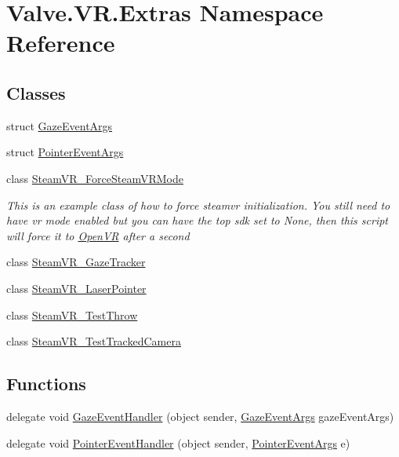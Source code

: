 \hypertarget{namespace_valve_1_1_v_r_1_1_extras}{}\section{Valve.\+V\+R.\+Extras Namespace Reference}
\label{namespace_valve_1_1_v_r_1_1_extras}
\subsection*{Classes}
\begin{DoxyCompactItemize}
\item 
struct \mbox{\hyperlink{struct_valve_1_1_v_r_1_1_extras_1_1_gaze_event_args}{Gaze\+Event\+Args}}
\item 
struct \mbox{\hyperlink{struct_valve_1_1_v_r_1_1_extras_1_1_pointer_event_args}{Pointer\+Event\+Args}}
\item 
class \mbox{\hyperlink{class_valve_1_1_v_r_1_1_extras_1_1_steam_v_r___force_steam_v_r_mode}{Steam\+V\+R\+\_\+\+Force\+Steam\+V\+R\+Mode}}
\begin{DoxyCompactList}\small\item\em This is an example class of how to force steamvr initialization. You still need to have vr mode enabled but you can have the top sdk set to None, then this script will force it to \mbox{\hyperlink{class_valve_1_1_v_r_1_1_open_v_r}{Open\+VR}} after a second \end{DoxyCompactList}\item 
class \mbox{\hyperlink{class_valve_1_1_v_r_1_1_extras_1_1_steam_v_r___gaze_tracker}{Steam\+V\+R\+\_\+\+Gaze\+Tracker}}
\item 
class \mbox{\hyperlink{class_valve_1_1_v_r_1_1_extras_1_1_steam_v_r___laser_pointer}{Steam\+V\+R\+\_\+\+Laser\+Pointer}}
\item 
class \mbox{\hyperlink{class_valve_1_1_v_r_1_1_extras_1_1_steam_v_r___test_throw}{Steam\+V\+R\+\_\+\+Test\+Throw}}
\item 
class \mbox{\hyperlink{class_valve_1_1_v_r_1_1_extras_1_1_steam_v_r___test_tracked_camera}{Steam\+V\+R\+\_\+\+Test\+Tracked\+Camera}}
\end{DoxyCompactItemize}
\subsection*{Functions}
\begin{DoxyCompactItemize}
\item 
delegate void \mbox{\hyperlink{namespace_valve_1_1_v_r_1_1_extras_a4cb3a72925225d55e7ba6357ef173696}{Gaze\+Event\+Handler}} (object sender, \mbox{\hyperlink{struct_valve_1_1_v_r_1_1_extras_1_1_gaze_event_args}{Gaze\+Event\+Args}} gaze\+Event\+Args)
\item 
delegate void \mbox{\hyperlink{namespace_valve_1_1_v_r_1_1_extras_a4f3c764399c18eb442dd4f3c4fcba807}{Pointer\+Event\+Handler}} (object sender, \mbox{\hyperlink{struct_valve_1_1_v_r_1_1_extras_1_1_pointer_event_args}{Pointer\+Event\+Args}} e)
\end{DoxyCompactItemize}


